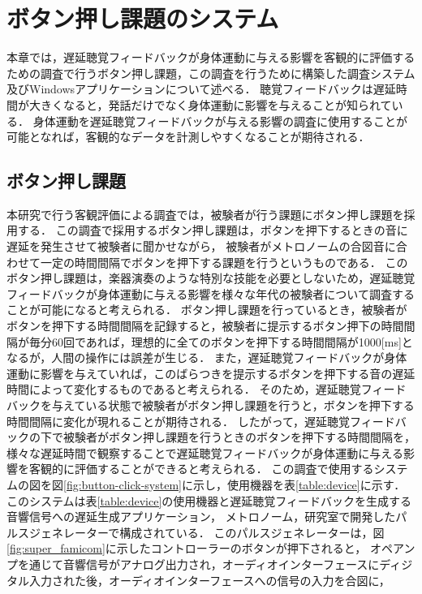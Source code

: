 \chapter{ボタン押し課題のシステム}
本章では，遅延聴覚フィードバックが身体運動に与える影響を客観的に評価するための調査で行うボタン押し課題，この調査を行うために構築した調査システム及びWindowsアプリケーションについて述べる．
聴覚フィードバックは遅延時間が大きくなると，発話だけでなく身体運動に影響を与えることが知られている\cite{timing-music}\cite{shimada-DAF}．
身体運動を遅延聴覚フィードバックが与える影響の調査に使用することが可能となれば，客観的なデータを計測しやすくなることが期待される．

\section{ボタン押し課題}
本研究で行う客観評価による調査では，被験者が行う課題にボタン押し課題を採用する．
この調査で採用するボタン押し課題は，ボタンを押下するときの音に遅延を発生させて被験者に聞かせながら，
被験者がメトロノームの合図音に合わせて一定の時間間隔でボタンを押下する課題を行うというものである．
このボタン押し課題は，楽器演奏のような特別な技能を必要としないため，遅延聴覚フィードバックが身体運動に与える影響を様々な年代の被験者について調査することが可能になると考えられる．
ボタン押し課題を行っているとき，被験者がボタンを押下する時間間隔を記録すると，被験者に提示するボタン押下の時間間隔が毎分60回であれば，理想的に全てのボタンを押下する時間間隔が1000[ms]となるが，人間の操作には誤差が生じる．
また，遅延聴覚フィードバックが身体運動に影響を与えていれば，このばらつきを提示するボタンを押下する音の遅延時間によって変化するものであると考えられる．
そのため，遅延聴覚フィードバックを与えている状態で被験者がボタン押し課題を行うと，ボタンを押下する時間間隔に変化が現れることが期待される．
したがって，遅延聴覚フィードバックの下で被験者がボタン押し課題を行うときのボタンを押下する時間間隔を，
様々な遅延時間で観察することで遅延聴覚フィードバックが身体運動に与える影響を客観的に評価することができると考えられる．
この調査で使用するシステムの図を図\ref{fig:button-click-system}に示し，使用機器を表\ref{table:device}に示す．
このシステムは表\ref{table:device}の使用機器と遅延聴覚フィードバックを生成する音響信号への遅延生成アプリケーション，
メトロノーム，研究室で開発したパルスジェネレーターで構成されている．
このパルスジェネレーターは，図\ref{fig:super_famicom}に示したコントローラーのボタンが押下されると，
オペアンプを通じて音響信号がアナログ出力され，オーディオインターフェースにディジタル入力された後，オーディオインターフェースへの信号の入力を合図に，
